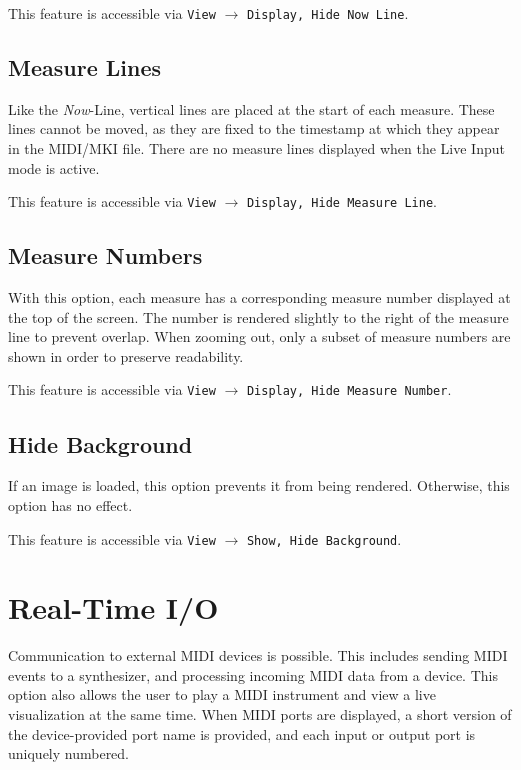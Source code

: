 \documentclass[english]{article}
\providecommand{\mi}[1]{\texttt{#1}}
\begin{document}
This feature is accessible via 
\mi{View} $\rightarrow$ \mi{{Display, Hide} Now Line}.

\subsection{Measure Lines}

Like the \textit{Now}-Line, vertical lines are placed at the start of each measure. These lines cannot be moved, as 
they are fixed to the timestamp at which they appear in the MIDI/MKI file.
There are no measure lines displayed when the Live Input mode is active.

This feature is accessible via 
\mi{View} $\rightarrow$ \mi{{Display, Hide} Measure Line}.

\subsection{Measure Numbers}

With this option, each measure has a corresponding measure number displayed at the top of the screen. The number is rendered
slightly to the right of the measure line to prevent overlap. When zooming out, only a subset of measure numbers are shown in
order to preserve readability.

This feature is accessible via 
\mi{View} $\rightarrow$ \mi{{Display, Hide} Measure Number}.

\subsection{Hide Background}

If an image is loaded, this option prevents it from being rendered. Otherwise, this option has no effect.

This feature is accessible via 
\mi{View} $\rightarrow$ \mi{{Show, Hide} Background}.

\section{Real-Time I/O}

Communication to external MIDI devices is possible. This includes sending MIDI events to a synthesizer,
and processing incoming MIDI data from a device. This option also allows the user to play a MIDI instrument and
view a live visualization at the same time. When MIDI ports are displayed, a short version of the device-provided
port name is provided, and each input or output port is uniquely numbered.
\end{document}
